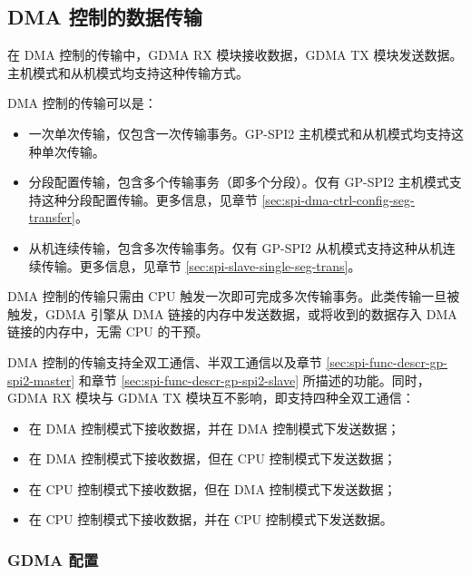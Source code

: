 \documentclass[main\_\_CN.tex]{subfiles}
\begin{document}
\subsection{DMA 控制的数据传输}\label{sec:spi-func-descr-dma-ctrl-data-transfer}

在 DMA 控制的传输中，GDMA RX 模块接收数据，GDMA TX 模块发送数据。主机模式和从机模式均支持这种传输方式。

DMA 控制的传输可以是：

\begin{itemize}
    \item 一次单次传输，仅包含一次传输事务。GP-SPI2 主机模式和从机模式均支持这种单次传输。
    \item 分段配置传输，包含多个传输事务（即多个分段）。仅有 GP-SPI2 主机模式支持这种分段配置传输。更多信息，见章节  \ref{sec:spi-dma-ctrl-config-seg-transfer}。
    \item 从机连续传输，包含多次传输事务。仅有 GP-SPI2 从机模式支持这种从机连续传输。更多信息，见章节  \ref{sec:spi-slave-single-seg-trans}。
\end{itemize}

DMA 控制的传输只需由 CPU 触发一次即可完成多次传输事务。此类传输一旦被触发，GDMA 引擎从 DMA 链接的内存中发送数据，或将收到的数据存入 DMA 链接的内存中，无需 CPU 的干预。

DMA 控制的传输支持全双工通信、半双工通信以及章节 \ref{sec:spi-func-descr-gp-spi2-master} 和章节 \ref{sec:spi-func-descr-gp-spi2-slave} 所描述的功能。同时，GDMA RX 模块与 GDMA TX 模块互不影响，即支持四种全双工通信：

\begin{itemize}
    \item 在 DMA 控制模式下接收数据，并在 DMA 控制模式下发送数据；

    \item 在 DMA 控制模式下接收数据，但在 CPU 控制模式下发送数据；

    \item 在 CPU 控制模式下接收数据，但在 DMA 控制模式下发送数据；

    \item 在 CPU 控制模式下接收数据，并在 CPU 控制模式下发送数据。

\end{itemize}


\subsubsection{GDMA 配置}\label{sec:spi-dma-config}
\end{document}
